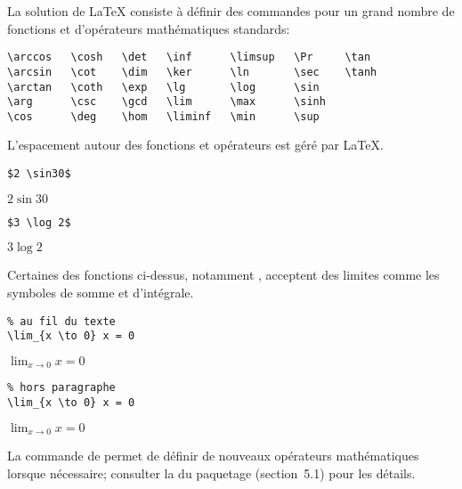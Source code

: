 La solution de {\LaTeX} consiste à définir des commandes pour un grand
nombre de fonctions et d'opérateurs mathématiques standards:
\begin{lstlisting}
\arccos   \cosh   \det   \inf      \limsup   \Pr     \tan
\arcsin   \cot    \dim   \ker      \ln       \sec    \tanh
\arctan   \coth   \exp   \lg       \log      \sin
\arg      \csc    \gcd   \lim      \max      \sinh
\cos      \deg    \hom   \liminf   \min      \sup
\end{lstlisting}
L'espacement autour des fonctions et opérateurs est géré par {\LaTeX}.
\begin{demo}
  \begin{minipage}{0.45\linewidth}
    \begin{texample}
\begin{lstlisting}
$2 \sin30$
\end{lstlisting}
      \producing
      $2 \sin30$
    \end{texample}
  \end{minipage}
  \hfill
  \begin{minipage}{0.45\linewidth}
    \begin{texample}
\begin{lstlisting}
$3 \log 2$
\end{lstlisting}
      \producing
      $3 \log 2$
    \end{texample}
  \end{minipage}
\end{demo}

Certaines des fonctions ci-dessus, notamment \cmd{\lim}, acceptent des
limites comme les symboles de somme et d'intégrale.
\begin{demo}
  \begin{texample}
\begin{lstlisting}
% au fil du texte
\lim_{x \to 0} x = 0
\end{lstlisting}
    \producing $\lim_{x \to 0} x = 0$
  \end{texample}

  \begin{texample}
\begin{lstlisting}
% hors paragraphe
\lim_{x \to 0} x = 0
\end{lstlisting}
    \producing $\displaystyle \lim_{x \to 0} x = 0$
  \end{texample}
\end{demo}

La commande \cmd{\DeclareMathOperator} de  permet de
définir de nouveaux opérateurs mathématiques lorsque nécessaire;
consulter la %
du paquetage (section~5.1) pour les détails.


